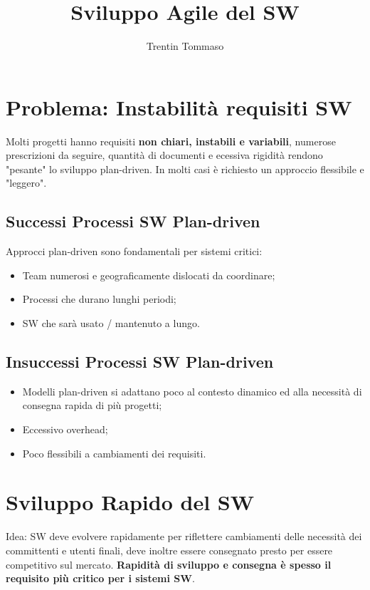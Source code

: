 \documentclass{article}
\title{Sviluppo Agile del SW}
\author{Trentin Tommaso}
\begin{document}
  \maketitle
  \tableofcontents
  \newpage
  \section{Problema: Instabilità requisiti SW}
    Molti progetti hanno requisiti \textbf{non chiari, instabili e variabili}, numerose prescrizioni da seguire, quantità di documenti e ecessiva rigidità rendono "pesante" lo sviluppo plan-driven. In molti casi è richiesto un approccio flessibile e "leggero".
    \subsection{Successi Processi SW Plan-driven}
      Approcci plan-driven sono fondamentali per sistemi critici:
      \begin{itemize}
        \item Team numerosi e geograficamente dislocati da coordinare;
        \item Processi che durano lunghi periodi;
        \item SW che sarà usato / mantenuto a lungo. 
      \end{itemize}
    \subsection{Insuccessi Processi SW Plan-driven}
      \begin{itemize}
        \item Modelli plan-driven si adattano poco al contesto dinamico ed alla necessità di consegna rapida di più progetti;
        \item Eccessivo overhead;
        \item Poco flessibili a cambiamenti dei requisiti.
      \end{itemize}
  \section{Sviluppo Rapido del SW}
    Idea: SW deve evolvere rapidamente per riflettere cambiamenti delle necessità dei committenti e utenti finali, deve inoltre essere consegnato presto per essere competitivo sul mercato. \textbf{Rapidità di sviluppo e consegna è spesso il requisito più critico per i sistemi SW}. 
\end{document}
